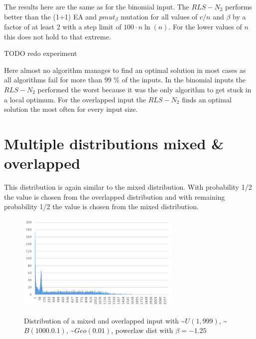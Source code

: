 

The results here are the same as for the binomial input. The $RLS-N_2$ performs better than the (1+1) EA and $pmut_\beta$ mutation for all values of $c/n$ and $\beta$ by a factor of at least 2 with a step limit of $100 \cdot n \ln(n)$. For the lower values of $n$ this does not hold to that extreme.

TODO redo experiment



Here almost no algorithm manages to find an optimal solution in most cases as all algorithms fail for more than 99 \% of the inputs.
In the binomial inputs the $RLS-N_2$ performed the worst because it was the only algorithm to get stuck in a local optimum.
For the overlapped input the $RLS-N_2$ finds an optimal solution the most often for every input size.




\section{Multiple distributions mixed \& overlapped}
This distribution is again similar to the mixed distribution.
With probability 1/2 the value is chosen from the overlapped distribution and with remaining probability 1/2 the value is chosen from the mixed distribution.

\begin{figure}[h]
      \caption{Distribution of a mixed and overlapped input with \textasciitilde$U(1,999)$, \textasciitilde$B(1000.0.1)$, \textasciitilde$Geo(0.01)$, powerlaw dist with $\beta=-1.25$}
      \centering
      \includegraphics[width=0.7\textwidth]{figures/images/numberGenerator/mixedAndOverlapped.png}\label{fig:mixAndOverlDistExample}
\end{figure}

